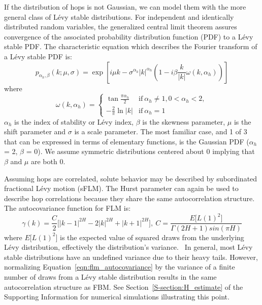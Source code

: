 \documentclass{article}
\begin{document}
  If the distribution of hops is not Gaussian, we can model them with the
  more general class of L\'evy stable distributions. For independent and identically
  distributed random variables, the generalized central limit theorem assures 
  convergence of the associated probability distribution function (PDF) to a 
  L\'evy stable PDF. \cite{klages_anomalous_2008} The characteristic equation which 
  describes the Fourier transform of a L\'evy stable PDF is:
  \begin{equation}
    p_{\alpha_h, \beta}(k;\mu,\sigma) =\exp\left[i\mu k - \sigma^{\alpha_h}|k|^{\alpha_h}\left(1 - i\beta\frac{k}{|k|}\omega(k, \alpha_h)\right)\right]
  \end{equation}
  where \\
  \[\omega(k, \alpha_h) = \begin{cases}
  	\tan{\frac{\pi \alpha_h}{2}} & \text{if}~\alpha_h \neq 1, 0 < \alpha_h < 2, \\
  	-\frac{2}{\pi}\ln |k| & \text{if}~\alpha_h = 1
  	 \end{cases}
  \]
  $\alpha_h$ is the index of stability or L\'evy index, $\beta$ is the skewness 
  parameter, $\mu$ is the shift parameter and $\sigma$ is a scale parameter. The most
  familiar case, and 1 of 3 that can be expressed in terms of elementary functions,
  is the Gaussian PDF ($\alpha_h$ = 2, $\beta$ = 0). We assume symmetric distributions
  centered about 0 implying that $\beta$ and $\mu$ are both 0.
  
  Assuming hops are correlated, solute behavior may be described by subordinated 
  fractional L\'evy motion (sFLM). The Hurst parameter can again be used to describe
  hop correlations because they share the same autocorrelation structure.~\cite{tikanmaki_fractional_2010}
  The autocovariance function for FLM is:
  \begin{equation}
    \gamma(k) = \dfrac{C}{2}\bigg[|k-1|^{2H} - 2|k|^{2H} + |k+1|^{2H}\bigg],
    ~C = \frac{E\big[L(1)^2\big]}{\Gamma(2H + 1)sin(\pi H)}
    \label{eqn:flm_autocovariance}
  \end{equation}
  where $E\big[L(1)^2\big]$ is the expected value of squared draws from the 
  underlying L\'evy distribution, effectively the distribution's 
  variance.~\cite{bishwal_maximum_2011} In general, most L\'evy stable distributions
  have an undefined variance due to their heavy tails. However, normalizing
  Equation~\ref{eqn:flm_autocovariance} by the variance of a finite number of draws
  from a L\'evy stable distribution results in the same autocorrelation structure as FBM.
  See Section~\ref{S-section:H_estimate} of the Supporting Information for numerical
  simulations illustrating this point.  %
  
\end{document}
